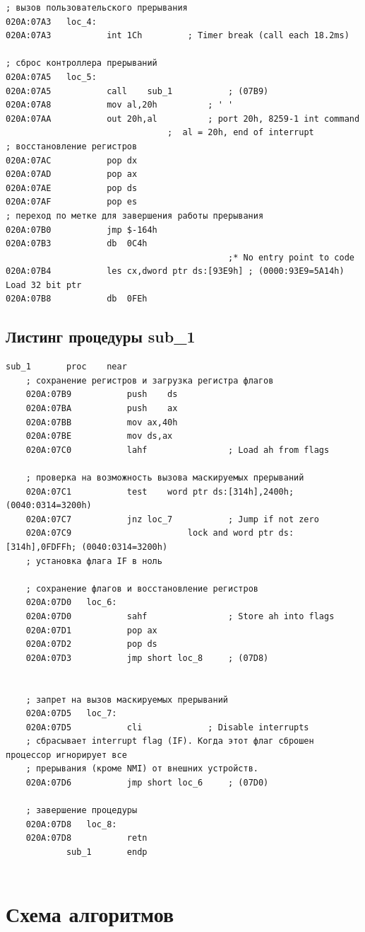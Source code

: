 \documentclass[a4paper,12pt]{article}
\begin{document}
\begin{lstlisting}[style={asm}]
; вызов пользовательского прерывания
020A:07A3	loc_4:
020A:07A3			int	1Ch			; Timer break (call each 18.2ms)

; сброс контроллера прерываний
020A:07A5	loc_5:
020A:07A5			call	sub_1			; (07B9)
020A:07A8			mov	al,20h			; ' '
020A:07AA			out	20h,al			; port 20h, 8259-1 int command
								;  al = 20h, end of interrupt
; восстановление регистров
020A:07AC			pop	dx
020A:07AD			pop	ax
020A:07AE			pop	ds
020A:07AF			pop	es
; переход по метке для завершения работы прерывания
020A:07B0			jmp	$-164h
020A:07B3			db	0C4h
					                        ;* No entry point to code
020A:07B4			les	cx,dword ptr ds:[93E9h]	; (0000:93E9=5A14h) Load 32 bit ptr
020A:07B8			db	0FEh

\end{lstlisting}

\clearpage
\subsection{Листинг процедуры sub\_1}

\begin{lstlisting}[style={asm}]
	sub_1		proc	near
	; сохранение регистров и загрузка регистра флагов
	020A:07B9			push	ds
	020A:07BA			push	ax
	020A:07BB			mov	ax,40h
	020A:07BE			mov	ds,ax
	020A:07C0			lahf				; Load ah from flags
	
	; проверка на возможность вызова маскируемых прерываний
	020A:07C1			test	word ptr ds:[314h],2400h; (0040:0314=3200h)
	020A:07C7			jnz	loc_7			; Jump if not zero
	020A:07C9	                    lock and word ptr ds:[314h],0FDFFh; (0040:0314=3200h)
	; установка флага IF в ноль
	
	; сохранение флагов и восстановление регистров
	020A:07D0	loc_6:
	020A:07D0			sahf				; Store ah into flags
	020A:07D1			pop	ax
	020A:07D2			pop	ds
	020A:07D3			jmp	short loc_8		; (07D8)
	
	
	; запрет на вызов маскируемых прерываний
	020A:07D5	loc_7:
	020A:07D5			cli				; Disable interrupts
	; сбрасывает interrupt flag (IF). Когда этот флаг сброшен процессор игнорирует все  
	; прерывания (кроме NMI) от внешних устройств.
	020A:07D6			jmp	short loc_6		; (07D0)
	
	; завершение процедуры
	020A:07D8	loc_8:
	020A:07D8			retn
			sub_1		endp
	
\end{lstlisting}
\clearpage

\section{Схема алгоритмов}
\end{document}
